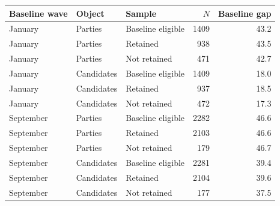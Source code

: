 \begin{tabular}{lllrr}
\toprule
Baseline wave & Object & Sample & $N$ & Baseline gap \\
\midrule
January & Parties & Baseline eligible & 1409 & 43.2 \\
January & Parties & Retained &  938 & 43.5 \\
January & Parties & Not retained &  471 & 42.7 \\
January & Candidates & Baseline eligible & 1409 & 18.0 \\
January & Candidates & Retained &  937 & 18.5 \\
January & Candidates & Not retained &  472 & 17.3 \\
September & Parties & Baseline eligible & 2282 & 46.6 \\
September & Parties & Retained & 2103 & 46.6 \\
September & Parties & Not retained &  179 & 46.7 \\
September & Candidates & Baseline eligible & 2281 & 39.4 \\
September & Candidates & Retained & 2104 & 39.6 \\
September & Candidates & Not retained &  177 & 37.5 \\
\bottomrule
\end{tabular}

